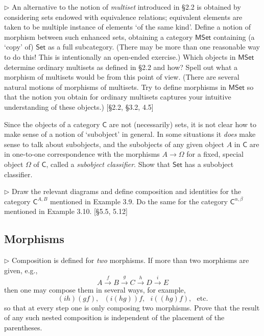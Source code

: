 \begin{problem}
  \def \Set {\mathsf{Set}}
  \def \MSet {\mathsf{MSet}}

  $\rhd$ An alternative to the notion of \textit{multiset} introduced in
  \S2.2 is obtained by considering sets endowed with equivalence relations;
  equivalent elements are taken to be multiple instance of elements `of the
  same kind'. Define a notion of morphism between such enhanced sets,
  obtaining a category $\MSet$ containing (a `copy' of) $\Set$ as a full
  subcategory. (There may be more than one reasonable way to do this!
  This is intentionally an open-ended exercise.) Which objects in $\MSet$
  determine ordinary multisets as defined in \S2.2 and how? Spell out what
  a morphism of multisets would be from this point of view. (There are
  several natural motions of morphisms of multisets. Try to define morphisms
  in $\MSet$ so that the notion you obtain for ordinary multisets captures
  your intuitive understanding of these objects.) [\S2.2, \S3.2, 4.5]
\end{problem}

\begin{problem}
  \def \C {\mathsf{C}}
  \def \Set {\mathsf{Set}}

  Since the objects of a category $\C$ are not (necessarily) sets, it is not
  clear how to make sense of a notion of `subobject' in general. In some
  situations it \textit{does} make sense to talk about subobjects, and the
  subobjects of any given object $A$ in $\C$ are in one-to-one correspondence
  with the morphisms $A\to\Omega$ for a fixed, special object $\Omega$ of
  $\C$, called a \textit{subobject classifier}. Show that $\Set$ has
  a subobject classifier.
\end{problem}

\begin{problem}
  \def \C {\mathsf{C}}

  $\rhd$ Draw the relevant diagrams and define composition and identities for
  the category $\C^{A,B}$ mentioned in Example 3.9. Do the same for the
  category $\C^{\alpha,\beta}$ mentioned in Example 3.10. [\S5.5, 5.12]
\end{problem}

\subsection{Morphisms}


\begin{problem}
  $\rhd$ Composition is defined for \textit{two} morphisms. If more than two
  morphisms are given, e.g.,
  \[ A \xrightarrow{f} B \xrightarrow{g} C \xrightarrow{h} D \xrightarrow{i} E \]
  then one may compose them in several ways, for example,
  \[ (ih)(gf),\,\,\,\,(i(hg))f,\,\,\,\,i((hg)f),\,\,\,\,\text{etc.}\]
  so that at every step one is only composing two morphisms. Prove that the
  result of any such nested composition is independent of the placement of
  the parentheses.
\end{problem}

